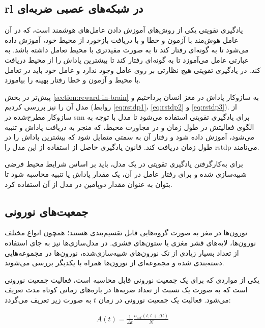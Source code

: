 \documentclass[12pt]{report}
\begin{document}
	\subsection{\gls{rl} در شبکه‌های عصبی ضربه‌ای}
	
	یادگیری تقویتی یکی از روش‌های آموزش دادن عامل‌های هوشمند است، که در آن عامل هوش‌مند با آزمون و خطا و با دریافت بازخورد از محیط خود، آموزش داده می‌شود تا به گونه‌ای رفتار کند تا به صورت مفیدتری با محیط تعامل داشته باشد. به عبارتی عامل می‌آموزد تا به گونه‌ای رفتار کند تا بیشترین پاداش را از محیط دریافت کند. در یادگیری تقویتی هیچ نظارتی بر روی عامل وجود ندارد و عامل خود باید در تعامل با محیط و آزمون و خطا رفتار بهینه را بیاموزد.
	
	پیش‌تر در بخش \ref{section:reward-in-brain} به سازوکار پاداش در مغز انسان پرداختیم و مدل آن را نیز بررسی کردیم (روابط \ref{eq:rstdp1}، \ref{eq:rstdp2} و \ref{eq:rstdp3}). از سازوکار مطرح‌شده در \gls{snn} برای یادگیری تقویتی استفاده می‌شود تا مدل با توجه به الگوی فعالیتش در طول زمان و در مجاورت محیط، که منجر به دریافت پاداش و تنبیه می‌شود، آموزش داده شود و رفتار آن به سمتی متمایل شود که بیشترین پاداش را در طول زمان دریافت کند. قانون یادگیری حاصل از استفاده از این مدل را \gls{rstdp} می‌نامند.
	
	برای به‌کار‌گرفتن یادگیری تقویتی در یک مدل، باید بر اساس شرایط محیط فرضی شبیه‌سازی شده و برای رفتار عامل در آن، یک مقدار پاداش یا تنبیه محاسبه شود تا بتوان به عنوان مقدار دوپامین در مدل از آن استفاده کرد.
 	
 	
	\subsection{جمعیت‌های نورونی}
	نورون‌ها در مغز به صورت گروه‌هایی قابل تقسیم‌بندی هستند؛ همچون انواع مختلف نورون‌ها، لایه‌های قشر مغزی یا ستون‌های قشری. در مدل‌سازی‌ها نیز به جای استفاده از تعداد بسیار زیادی از تک نورون‌های شبیه‌سازی‌شده، نورون‌ها در مجموعه‌هایی دسته‌بندی شده و مجموعه‌ای از نورون‌ها همراه با یکدیگر بررسی می‌شوند. 
	
	یکی از مواردی که برای یک جمعیت نورونی قابل محاسبه است، فعالیت جمعیت نورونی است که به صورت یک نسبت از تعداد ضربه‌ها در بازه‌های زمانی کوتاه مدت تعریف می‌شود. فعالیت یک جمعیت نورونی در زمان $t$ به صورت زیر تعریف می‌گردد:
	
	\begin{align}
		A(t) = \frac{1}{\Delta t} \frac{n_{act}(t; t+\Delta t)}{N}
		\label{eq:stdp}
	\end{align}
	
\end{document}
